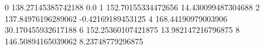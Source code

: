 0 138.27145385742188 0.0
1 152.70155334472656 14.430099487304688
2 137.84976196289062 -0.42169189453125
4 168.44190979003906 30.170455932617188
6 152.25360107421875 13.982147216796875
8 146.50894165039062 8.23748779296875

